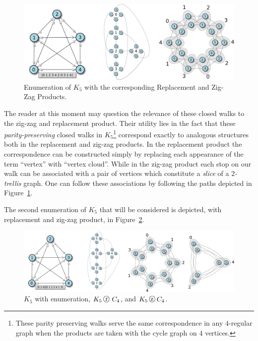 \begin{figure}[h!]
  \centering
  \begin{minipage}{.85\textwidth}
  \includegraphics[width=\textwidth]{pics/10-example}
  \caption{Enumeration of $K_5$ with the corresponding Replacement and Zig-Zag Products.\label{fig:10-example}}
  \end{minipage}
\end{figure}


The reader at this moment may question the relevance of these closed walks to the zig-zag and replacement product. Their utility lies in the fact that these {\em parity-preserving } closed walks in $K_5$\footnote{These parity preserving walks serve the same correspondence in any $4$-regular graph when the products are taken with the cycle graph on 4 vertices.} correspond exactly to analogous structures both in the replacement and zig-zag products. In the replacement product the correspondence can be constructed simply by replacing each appearance of the term ``vertex'' with ``vertex cloud''. While in the zig-zag product each stop on our walk can be associated with a pair of vertices which constitute a {\em slice} of a {\em $2$-trellis} graph. One can follow these associations by following the paths depicted in Figure~\ref{fig:10-example}.

The second enumeration of $K_5$ that will be considered is depicted, with replacement and zig-zag product, in Figure~\ref{fig:37-example}.

\begin{figure}[h!]
  \centering
  \begin{minipage}{.80\textwidth}
   \includegraphics[width=\textwidth]{pics/37-example}
  \caption{$K_5$ with enumeration, $K_5 \protect \replacement C_4$, and $K_5 \protect \zigzag C_4$.\label{fig:37-example}}
  \end{minipage}
\end{figure}

